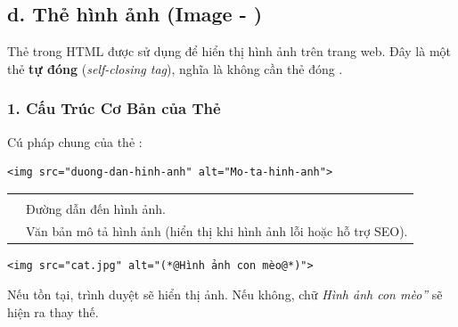 \subsection{d. Thẻ hình ảnh (Image - )}

Thẻ  trong HTML được sử dụng để hiển thị hình ảnh trên trang web. Đây là một thẻ \textbf{tự đóng} (\textit{self-closing tag}), nghĩa là không cần thẻ đóng .

\subsubsection{1. Cấu Trúc Cơ Bản của Thẻ }

Cú pháp chung của thẻ :

\begin{codeWindow}
\begin{lstlisting}[language=HTML5]
<img src="duong-dan-hinh-anh" alt="Mo-ta-hinh-anh">
\end{lstlisting}
\end{codeWindow}

\begin{prettyTableBox}
\begin{tabularx}{\linewidth}{C{2.5cm} Z}
 &  \\
 & Đường dẫn đến hình ảnh. \\
 & Văn bản mô tả hình ảnh (hiển thị khi hình ảnh lỗi hoặc hỗ trợ SEO). \\
\end{tabularx}
\end{prettyTableBox}

\begin{codeWindow}
\begin{lstlisting}[language=HTML5]
<img src="cat.jpg" alt="(*@Hình ảnh con mèo@*)">
\end{lstlisting}
\end{codeWindow}

\begin{noteBox}
Nếu  tồn tại, trình duyệt sẽ hiển thị ảnh. Nếu không, chữ \textit{\codeinline{}Hình ảnh con mèo''} sẽ hiện ra thay thế.
\end{noteBox}

